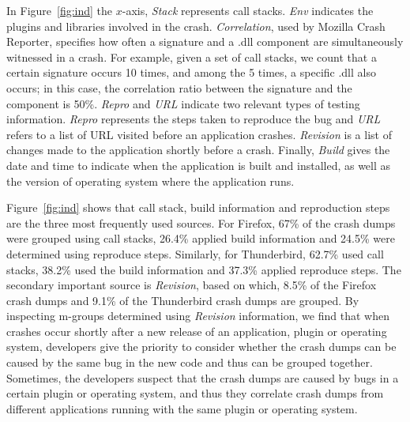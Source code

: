 \documentclass{llncs}
\begin{document}
In Figure~\ref{fig:ind} the $x$-axis, {\it Stack} represents call stacks. {\it Env} indicates the plugins and libraries involved in the crash. {\it Correlation}, used by Mozilla Crash Reporter, specifies how often a signature and a .dll component are simultaneously witnessed in a crash. For example, given a set of call stacks, we count that a certain signature occurs 10 times, and among the 5 times, a specific .dll also occurs; in this case, the correlation ratio between the signature and the component is 50\%. {\it Repro} and {\it URL} indicate two relevant types of testing information. {\it Repro} represents the steps taken to reproduce the bug and {\it URL} refers to a list of URL visited before an application crashes. {\it Revision} is a list of changes made to the application shortly before a crash. Finally, {\it Build} gives the date and time to indicate when the application is built and installed, as well as the version of operating system where the application runs.

Figure~\ref{fig:ind} shows that call stack, build information and reproduction steps are the three most frequently used sources. For Firefox, 67\% of the crash dumps were grouped using call stacks, 26.4\% applied build information and 24.5\% were determined using reproduce steps. Similarly, for Thunderbird, 62.7\% used call stacks,  38.2\% used the build information and 37.3\% applied reproduce steps. The secondary important source is {\it Revision}, based on which, 8.5\% of the Firefox crash dumps and 9.1\% of the Thunderbird crash dumps are grouped. By inspecting m-groups determined using {\it Revision} information, we find that when crashes occur shortly after a new release of an application, plugin or operating system, developers give the priority to consider whether the crash dumps can be caused by the same bug in the new code and thus can be grouped together. Sometimes, the developers suspect that the crash dumps are caused by bugs in a certain plugin or operating system, and thus they correlate crash dumps from different applications running with the same plugin or operating system.

\end{document}
